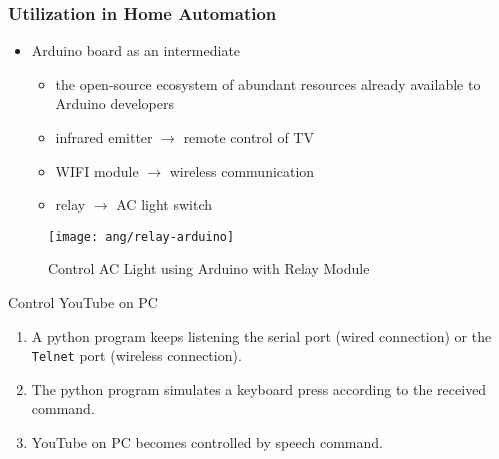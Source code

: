 \begin{frame}
\frametitle{Utilization in Home Automation}
\begin{itemize}
	\item Arduino\textsuperscript{\textregistered} board as an intermediate
		\begin{itemize}
		\item the open-source ecosystem of abundant resources already available to Arduino developers
		\item infrared emitter $\longrightarrow$ remote control of TV
		\item WIFI module $\longrightarrow$ wireless communication
		\item relay $\longrightarrow$ AC light switch
		\end{itemize}
\end{itemize}

\begin{figure}[H]
\centering
\texttt{[image: ang/relay-arduino]}
\caption{Control AC Light using Arduino with Relay Module \cite{relay-arduino}}
\end{figure}
\end{frame}

\begin{frame}
Control YouTube on PC
\begin{enumerate}
	\item A python program keeps listening the serial port (wired connection) or the \texttt{Telnet} port (wireless connection).
	\item The python program simulates a keyboard press according to the received command.
	\item YouTube on PC becomes controlled by speech command.
\end{enumerate}
\end{frame}
